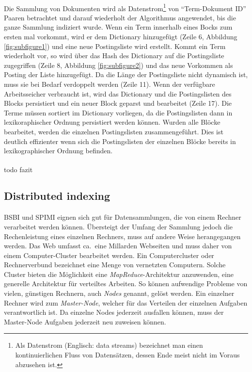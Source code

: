 \paragraph{}
 Die Sammlung von Dokumenten wird als Datenstrom\footnote{Als Datenstrom (Englisch: data streams) bezeichnet man einen kontinuierlichen Fluss von Datensätzen, dessen Ende meist nicht im Voraus abzusehen ist.} von \enquote{Term-Dokument ID} Paaren betrachtet und darauf wiederholt der Algorithmus angewendet, bis die ganze Sammlung indiziert wurde. Wenn ein Term innerhalb eines Bocks zum ersten mal vorkommt, wird er dem Dictionary hinzugefügt (Zeile 6, Abbildung \ref{fig:subfigure1}) und eine neue Postingsliste wird erstellt. Kommt ein Term wiederholt vor, so wird über das Hash des Dictionary auf die Postingsliste zugegriffen (Zeile 8, Abbildung \ref{fig:subfigure2}) und das neue Vorkommen als Posting der Liste hinzugefügt. Da die Länge der Postingsliste nicht dynamisch ist, muss sie bei Bedarf verdoppelt werden (Zeile 11). Wenn der verfügbare Arbeitsseicher verbraucht ist, wird das Dictionary und die Postingslisten des Blocks persistiert und ein neuer Block geparst und bearbeitet (Zeile 17). Die Terme müssen sortiert im Dictionary vorliegen, da die Postingslisten dann in lexikoraphischer Ordnung persistiert werden können. Wurden alle Blöcke bearbeitet, werden die einzelnen Postingslisten zusammengeführt. Dies ist deutlich effizienter wenn sich die Postingslisten der einzelnen Blöcke bereits in lexikographischer Ordnung befinden.\par

\paragraph{}
todo fazit\par

\subsection{Distributed indexing}
\paragraph{}
BSBI und SPIMI eignen sich gut für Datensammlungen, die von einem Rechner verarbeitet werden können. Übersteigt der Umfang der Sammlung jedoch die Rechenleistung eines einzelnen Rechners, muss auf andere Weise herangegangen werden. Das Web umfasst ca.\ eine Millarden Webseiten und muss daher von einem Computer-Cluster bearbeitet werden. Ein Computercluster oder Rechnerverbund bezeichnet eine Menge von vernetzten Computern. Solche Cluster bieten die Möglichkeit eine \textit{MapReduce}-Architektur anzuwenden, eine generelle Architektur für verteiltes Arbeiten. So können aufwendige Probleme von vielen, günstigen Rechnern, auch \textit{Nodes} genannt, gelöst werden. Ein einzelner Rechner wird zum \textit{Master-Node}, welcher für das Verteilen der einzelnen Aufgaben verantwortlich ist. Da einzelne Nodes jederzeit ausfallen können, muss der Master-Node Aufgaben jederzeit neu zuweisen können.\par

